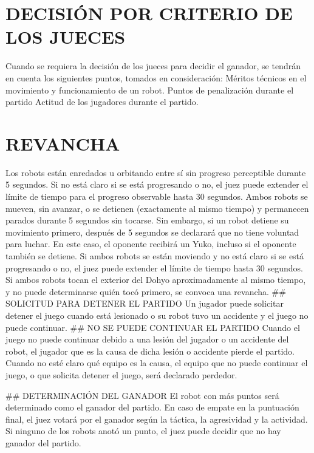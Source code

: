 \documentclass[
  letterpaper,
  DIV=11,
  numbers=noendperiod]{scrreprt}
\begin{document}
\section{DECISIÓN POR CRITERIO DE LOS
JUECES}\label{decisiuxf3n-por-criterio-de-los-jueces}

Cuando se requiera la decisión de los jueces para decidir el ganador, se
tendrán en cuenta los siguientes puntos, tomados en consideración:
Méritos técnicos en el movimiento y funcionamiento de un robot. Puntos
de penalización durante el partido Actitud de los jugadores durante el
partido.

\section{REVANCHA}\label{revancha}

Los robots están enredados u orbitando entre sí sin progreso perceptible
durante 5 segundos. Si no está claro si se está progresando o no, el
juez puede extender el límite de tiempo para el progreso observable
hasta 30 segundos. Ambos robots se mueven, sin avanzar, o se detienen
(exactamente al mismo tiempo) y permanecen parados durante 5 segundos
sin tocarse. Sin embargo, si un robot detiene su movimiento primero,
después de 5 segundos se declarará que no tiene voluntad para luchar. En
este caso, el oponente recibirá un Yuko, incluso si el oponente también
se detiene. Si ambos robots se están moviendo y no está claro si se está
progresando o no, el juez puede extender el límite de tiempo hasta 30
segundos. Si ambos robots tocan el exterior del Dohyo aproximadamente al
mismo tiempo, y no puede determinarse quién tocó primero, se convoca una
revancha. \#\# SOLICITUD PARA DETENER EL PARTIDO Un jugador puede
solicitar detener el juego cuando está lesionado o su robot tuvo un
accidente y el juego no puede continuar. \#\# NO SE PUEDE CONTINUAR EL
PARTIDO Cuando el juego no puede continuar debido a una lesión del
jugador o un accidente del robot, el jugador que es la causa de dicha
lesión o accidente pierde el partido. Cuando no esté claro qué equipo es
la causa, el equipo que no puede continuar el juego, o que solicita
detener el juego, será declarado perdedor.

\#\# DETERMINACIÓN DEL GANADOR El robot con más puntos será determinado
como el ganador del partido. En caso de empate en la puntuación final,
el juez votará por el ganador según la táctica, la agresividad y la
actividad. Si ninguno de los robots anotó un punto, el juez puede
decidir que no hay ganador del partido.
\end{document}

